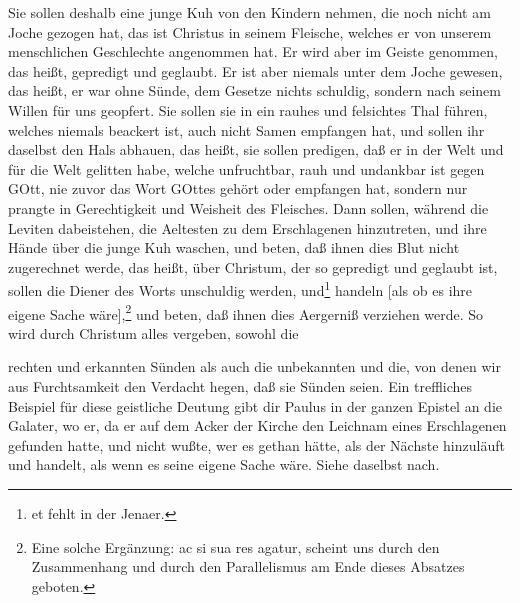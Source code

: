 Sie sollen deshalb eine junge Kuh von den Kindern nehmen, die noch nicht am Joche gezogen hat, das ist Christus in seinem Fleische, welches er von unserem menschlichen Geschlechte angenommen hat. Er wird aber im Geiste genommen, das heißt, gepredigt und geglaubt. Er ist aber niemals unter dem Joche gewesen, das heißt, er war ohne Sünde, dem Gesetze nichts schuldig, sondern nach seinem Willen für uns geopfert. Sie sollen sie in ein rauhes und felsichtes Thal führen, welches niemals beackert ist, auch nicht Samen empfangen hat, und sollen ihr daselbst den Hals abhauen, das heißt, sie sollen predigen, daß er in der Welt und für die Welt gelitten habe, welche unfruchtbar, rauh und undankbar ist gegen GOtt, nie zuvor das Wort GOttes gehört oder empfangen hat, sondern nur prangte in Gerechtigkeit und Weisheit des Fleisches. Dann sollen, während die Leviten dabeistehen, die Aeltesten zu dem Erschlagenen hinzutreten, und ihre Hände über die junge Kuh waschen, und beten, daß ihnen dies Blut nicht zugerechnet werde, das heißt, über Christum, der so gepredigt und geglaubt ist, sollen die Diener des Worts unschuldig werden, und\footnote{et fehlt in der Jenaer.} handeln [als ob es ihre eigene Sache wäre],\footnote{Eine solche Ergänzung: ac si sua res agatur, scheint uns durch den Zusammenhang und durch den Parallelismus am Ende dieses Absatzes geboten.} und beten, daß ihnen dies Aergerniß verziehen werde. So wird durch Christum alles vergeben, sowohl die

rechten und erkannten Sünden als auch die unbekannten und die, von denen wir aus Furchtsamkeit den Verdacht hegen, daß sie Sünden seien. Ein treffliches Beispiel für diese geistliche Deutung gibt dir Paulus in der ganzen Epistel an die Galater, wo er, da er auf dem Acker der Kirche den Leichnam eines Erschlagenen gefunden hatte, und nicht wußte, wer es gethan hätte, als der Nächste hinzuläuft und handelt, als wenn es seine eigene Sache wäre. Siehe daselbst nach.

